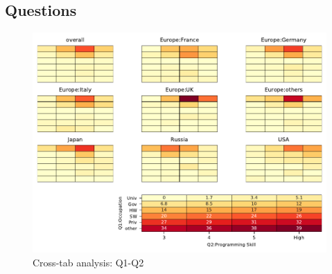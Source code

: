 
\subsection{Questions}


\begin{figure}
\begin{center}
\includegraphics[width=12cm]{../pdfs/Q1-Q2.pdf}
\caption{Cross-tab analysis: Q1-Q2}
\label{fig:Q1-Q2}
\end{center}
\end{figure}

